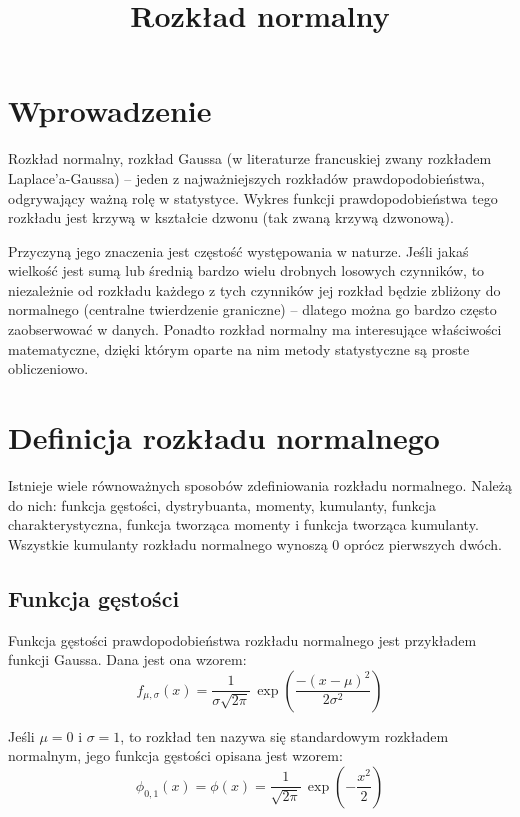 \documentclass{article}
\begin{document}
\title{Rozkład normalny}
\maketitle

\section*{Wprowadzenie}
Rozkład normalny, rozkład Gaussa (w literaturze francuskiej zwany rozkładem Laplace’a-Gaussa) – jeden z najważniejszych rozkładów prawdopodobieństwa, odgrywający ważną rolę w statystyce. Wykres funkcji prawdopodobieństwa tego rozkładu jest krzywą w kształcie dzwonu (tak zwaną krzywą dzwonową).

Przyczyną jego znaczenia jest częstość występowania w naturze. Jeśli jakaś wielkość jest sumą lub średnią bardzo wielu drobnych losowych czynników, to niezależnie od rozkładu każdego z tych czynników jej rozkład będzie zbliżony do normalnego (centralne twierdzenie graniczne) – dlatego można go bardzo często zaobserwować w danych. Ponadto rozkład normalny ma interesujące właściwości matematyczne, dzięki którym oparte na nim metody statystyczne są proste obliczeniowo. 

\section*{Definicja rozkładu normalnego}
Istnieje wiele równoważnych sposobów zdefiniowania rozkładu normalnego. Należą do nich: funkcja gęstości, dystrybuanta, momenty, kumulanty, funkcja charakterystyczna, funkcja tworząca momenty i funkcja tworząca kumulanty. Wszystkie kumulanty rozkładu normalnego wynoszą 0 oprócz pierwszych dwóch. 
\subsection*{Funkcja gęstości}
Funkcja gęstości prawdopodobieństwa rozkładu normalnego jest przykładem funkcji Gaussa. Dana jest ona wzorem: 
$$ f_{\mu ,\sigma }(x)={\frac {1}{\sigma {\sqrt {2\pi }}}}\,\exp \left({\frac {-(x-\mu )^{2}}{2\sigma ^{2}}}\right) $$

Jeśli \( \mu =0 \) i $ \sigma =1$, to rozkład ten nazywa się standardowym rozkładem normalnym, jego funkcja gęstości opisana jest wzorem: 
\begin{displaymath}
\phi _{0,1}(x)=\phi (x)={\frac {1}{\sqrt {2\pi }}}\,\exp \left(-{\frac {x^{2}}{2}}\right)
\end{displaymath}
\end{document}
